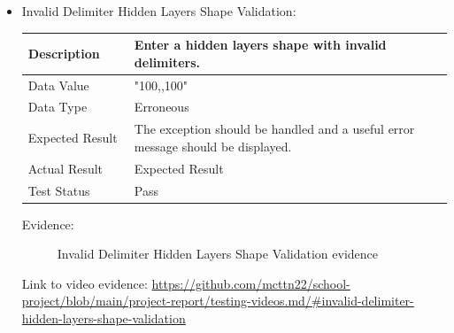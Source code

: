 \documentclass[./project-report/src/latex/project-report.tex]{subfiles}
\begin{document}
\begin{itemize}
	\pagebreak

	\item Invalid Delimiter Hidden Layers Shape Validation: \newline\newline
		\begin{tabular}{|p{0.25\linewidth}|p{0.75\linewidth}|}
			\hline
			Description & Enter a hidden layers shape with invalid delimiters. \\
			\hline
			Data Value & "100,,100" \\
			\hline
			Data Type & Erroneous \\
			\hline
			Expected Result & The exception should be handled and a useful error message should be displayed. \\
			\hline
			Actual Result & Expected Result \\
			\hline
			Test Status & Pass \\
			\hline
		\end{tabular}

		\vspace{5mm}

		Evidence:
		\begin{figure}[h!]
		\centering
		\caption{Invalid Delimiter Hidden Layers Shape Validation evidence}
		\end{figure}

		\begin{sloppypar}
		Link to video evidence: \url{https://github.com/mcttn22/school-project/blob/main/project-report/testing-videos.md/#invalid-delimiter-hidden-layers-shape-validation}
		\end{sloppypar}
\end{itemize}
\end{document}
